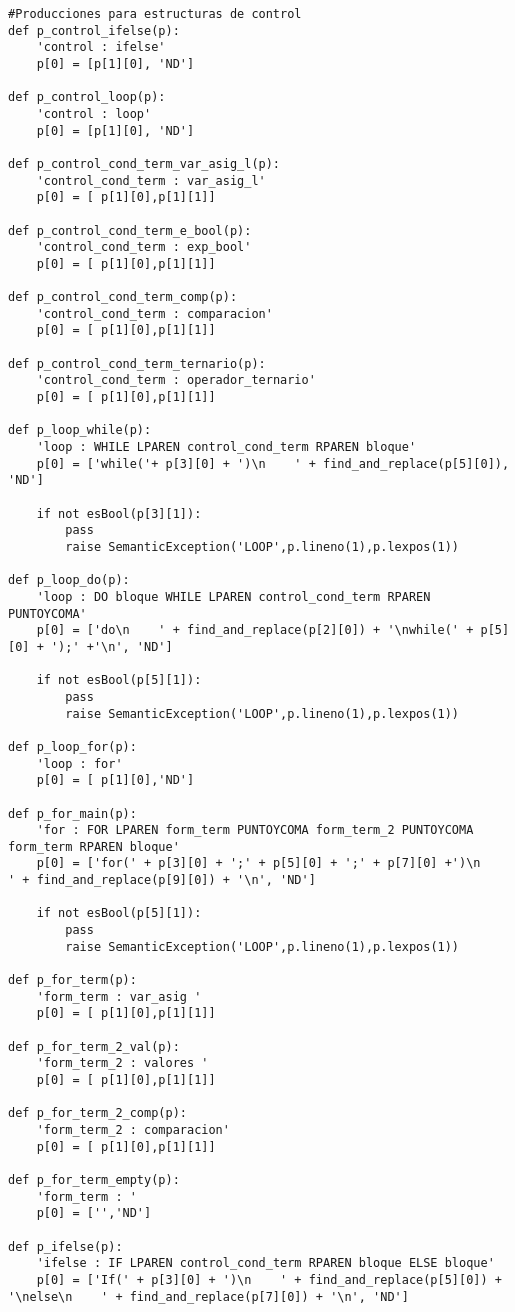 \begin{verbatim}
#Producciones para estructuras de control
def p_control_ifelse(p):
    'control : ifelse'
    p[0] = [p[1][0], 'ND']

def p_control_loop(p):
    'control : loop'
    p[0] = [p[1][0], 'ND']

def p_control_cond_term_var_asig_l(p):
    'control_cond_term : var_asig_l'
    p[0] = [ p[1][0],p[1][1]]

def p_control_cond_term_e_bool(p):
    'control_cond_term : exp_bool'
    p[0] = [ p[1][0],p[1][1]]

def p_control_cond_term_comp(p):
    'control_cond_term : comparacion'
    p[0] = [ p[1][0],p[1][1]]

def p_control_cond_term_ternario(p):
    'control_cond_term : operador_ternario'
    p[0] = [ p[1][0],p[1][1]]

def p_loop_while(p):
    'loop : WHILE LPAREN control_cond_term RPAREN bloque'
    p[0] = ['while('+ p[3][0] + ')\n    ' + find_and_replace(p[5][0]), 'ND']

    if not esBool(p[3][1]):
        pass
        raise SemanticException('LOOP',p.lineno(1),p.lexpos(1))

def p_loop_do(p):
    'loop : DO bloque WHILE LPAREN control_cond_term RPAREN PUNTOYCOMA'
    p[0] = ['do\n    ' + find_and_replace(p[2][0]) + '\nwhile(' + p[5][0] + ');' +'\n', 'ND']

    if not esBool(p[5][1]):
        pass
        raise SemanticException('LOOP',p.lineno(1),p.lexpos(1))

def p_loop_for(p):
    'loop : for'
    p[0] = [ p[1][0],'ND']

def p_for_main(p):
    'for : FOR LPAREN form_term PUNTOYCOMA form_term_2 PUNTOYCOMA form_term RPAREN bloque'
    p[0] = ['for(' + p[3][0] + ';' + p[5][0] + ';' + p[7][0] +')\n    ' + find_and_replace(p[9][0]) + '\n', 'ND']

    if not esBool(p[5][1]):
        pass
        raise SemanticException('LOOP',p.lineno(1),p.lexpos(1))

def p_for_term(p):
    'form_term : var_asig '
    p[0] = [ p[1][0],p[1][1]]

def p_for_term_2_val(p):
    'form_term_2 : valores '
    p[0] = [ p[1][0],p[1][1]]

def p_for_term_2_comp(p):
    'form_term_2 : comparacion'
    p[0] = [ p[1][0],p[1][1]]

def p_for_term_empty(p):
    'form_term : '
    p[0] = ['','ND']

def p_ifelse(p):
    'ifelse : IF LPAREN control_cond_term RPAREN bloque ELSE bloque'
    p[0] = ['If(' + p[3][0] + ')\n    ' + find_and_replace(p[5][0]) + '\nelse\n    ' + find_and_replace(p[7][0]) + '\n', 'ND']


\end{verbatim}

